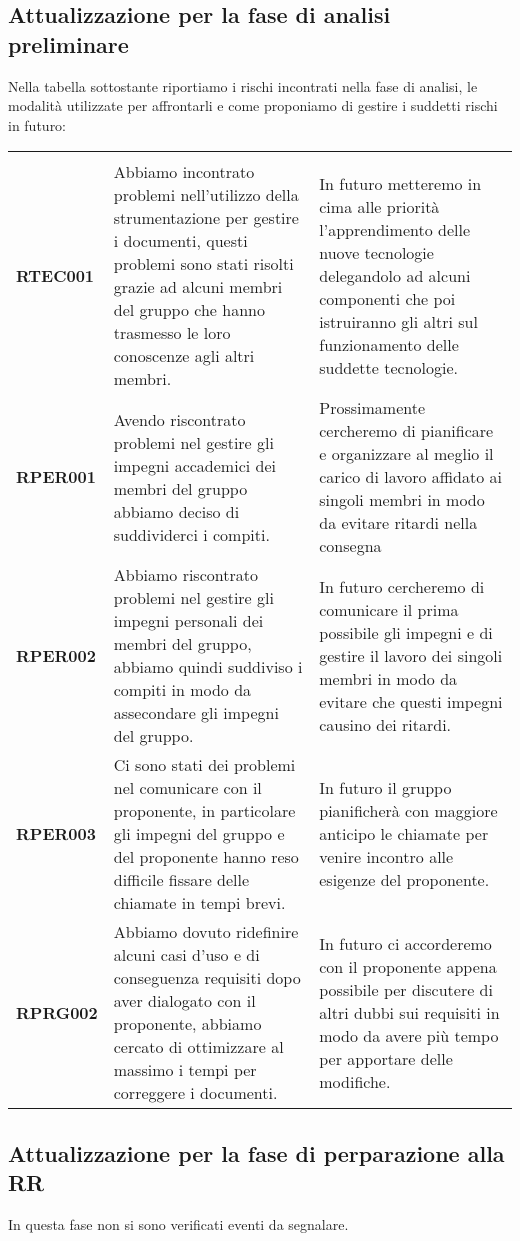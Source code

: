 \documentclass[../piano-di-progetto]{subfiles}
\begin{document}
\subsection{Attualizzazione per la fase di analisi preliminare}%
\label{sub:attualizzazione_fase_analisi_preliminare}
Nella tabella sottostante riportiamo i rischi incontrati nella fase di analisi, le modalità utilizzate per affrontarli e come proponiamo di gestire i suddetti rischi in futuro:
\begin{table}[H]%
  \label{tab:registro_delle_modifiche}

  \centering

  \begin{longtable}[H]{|p{10em}|p{17em}|p{17em}|}
    \rowcolor{darkgray!90!}\color{white}{\textbf{Rischio}} & \color{white}{\textbf{Gestione}} & \color{white}{\textbf{Monitoraggio}} \\
    \textbf{RTEC001} & Abbiamo incontrato problemi nell'utilizzo della strumentazione per gestire i documenti, questi problemi sono stati risolti grazie ad alcuni membri del gruppo che hanno trasmesso le loro conoscenze agli altri membri. & In futuro metteremo in cima alle priorità l'apprendimento delle nuove tecnologie delegandolo ad alcuni componenti che poi istruiranno gli altri sul funzionamento delle suddette tecnologie.\\
    \textbf{RPER001} & Avendo riscontrato problemi nel gestire gli impegni accademici dei membri del gruppo abbiamo deciso di suddividerci i compiti. & Prossimamente cercheremo di pianificare e organizzare al meglio il carico di lavoro affidato ai singoli membri in modo da evitare ritardi nella consegna\\
    \textbf{RPER002} & Abbiamo riscontrato problemi nel gestire gli impegni personali dei membri del gruppo, abbiamo quindi suddiviso i compiti in modo da assecondare gli impegni del gruppo. & In futuro cercheremo di comunicare il prima possibile gli impegni e di gestire il lavoro dei singoli membri in modo da evitare che questi impegni causino dei ritardi.\\
    \textbf{RPER003} & Ci sono stati dei problemi nel comunicare con il proponente, in particolare gli impegni del gruppo e del proponente hanno reso difficile fissare delle chiamate in tempi brevi. & In futuro il gruppo pianificherà con maggiore anticipo le chiamate per venire incontro alle esigenze del proponente.\\
    \textbf{RPRG002} & Abbiamo dovuto ridefinire alcuni casi d'uso e di conseguenza requisiti dopo aver dialogato con il proponente, abbiamo cercato di ottimizzare al massimo i tempi per correggere i documenti. & In futuro ci accorderemo con il proponente appena possibile per discutere di altri dubbi sui requisiti in modo da avere più tempo per apportare delle modifiche.\\
  \end{longtable}
\end{table}
\subsection{Attualizzazione per la fase di perparazione alla RR}%
\label{sub:attualizzazione_fase_prep_RR}
In questa fase non si sono verificati eventi da segnalare.
\end{document}

